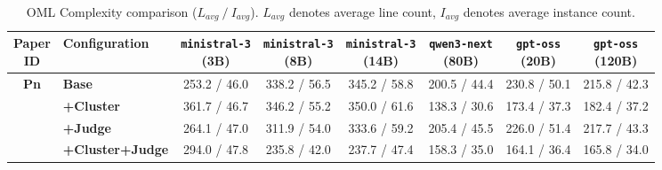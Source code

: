 \begin{table}[htbp]
    \centering
    \small
    \setlength{\tabcolsep}{4pt}
    \caption{OML Complexity comparison ($L_{avg}~/~I_{avg}$). $L_{avg}$ denotes average line count, $I_{avg}$ denotes average instance count.}
    \begin{tabular}{c|l|cccccc}
        \hline
        \makecell{\textbf{Paper} \\ \textbf{ID}} & \textbf{Configuration} & \makecell{\texttt{ministral-3} \\ (3B)} & \makecell{\texttt{ministral-3} \\ (8B)} & \makecell{\texttt{ministral-3} \\ (14B)} & \makecell{\texttt{qwen3-next} \\ (80B)} & \makecell{\texttt{gpt-oss} \\ (20B)} & \makecell{\texttt{gpt-oss} \\ (120B)} \\
        \hline
        
        \multirow{4}{*}{\textbf{Pn}} 
          & \textbf{Base} & 253.2 / 46.0 & 338.2 / 56.5 & 345.2 / 58.8 & 200.5 / 44.4 & 230.8 / 50.1 & 215.8 / 42.3\\
          & \textbf{+Cluster} & 361.7 / 46.7 & 346.2 / 55.2 & 350.0 / 61.6 & 138.3 / 30.6 & 173.4 / 37.3 & 182.4 / 37.2\\
          & \textbf{+Judge} & 264.1 / 47.0 & 311.9 / 54.0 & 333.6 / 59.2 & 205.4 / 45.5 & 226.0 / 51.4 & 217.7 / 43.3\\
          & \textbf{+Cluster+Judge} & 294.0 / 47.8 & 235.8 / 42.0 & 237.7 / 47.4 & 158.3 / 35.0 & 164.1 / 36.4 & 165.8 / 34.0\\
        \hline
        
    \end{tabular}
    \label{tab:complexity_pn}
\end{table}